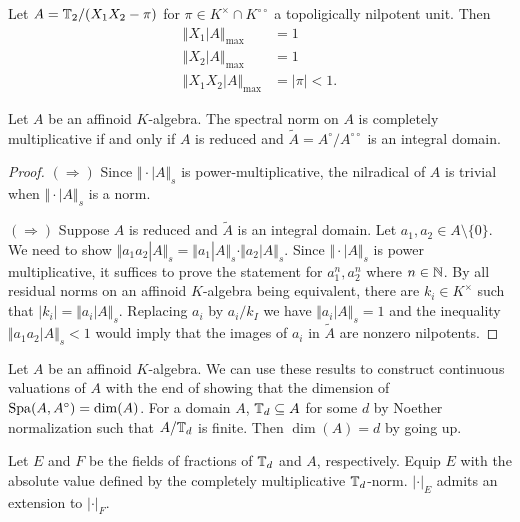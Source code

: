 \begin{example}
    Let $A=\mathbb{T}_{2}/(X_{1}X_{2}-\pi)$ for $\pi\in K^{\times}\cap K^{\circ\circ}$ a topoligically nilpotent unit. Then 
    \begin{align*}
        \Vert X_{1}|A\Vert_{\max}&=1 \\
        \Vert X_{2}|A\Vert_{\max}&=1 \\
        \Vert X_{1}X_{2}|A\Vert_{\max} &= |\pi|<1.
    \end{align*}
\end{example}
\begin{proposition}\label{prop: multiplicative iff reduced}
    Let $A$ be an affinoid $K$-algebra. The spectral norm on $A$ is completely multiplicative if and only if $A$ is reduced and $\widetilde{A}=A^{\circ}/A^{\circ\circ}$ is an integral domain. 
\end{proposition}
\begin{proof}
    $(\Rightarrow)$ Since $\Vert\cdot|A\Vert_{s}$ is power-multiplicative, the nilradical of $A$ is trivial when $\Vert\cdot|A\Vert_{s}$ is a norm. 

    $(\Rightarrow)$ Suppose $A$ is reduced and $\widetilde{A}$ is an integral domain. Let $a_{1},a_{2}\in A\setminus\{0\}$. We need to show $\Vert a_{1}a_{2}|A\Vert_{s}=\Vert a_{1}|A\Vert_{s}\cdot\Vert a_{2}|A\Vert_{s}$. Since $\Vert\cdot|A\Vert_{s}$ is power multiplicative, it suffices to prove the statement for $a_{1}^{n},a_{2}^{n}$ where $n\in\mathbb{N}$. By all residual norms on an affinoid $K$-algebra being equivalent, there are $k_{i}\in K^{\times}$ such that $|k_{i}|=\Vert a_{i}|A\Vert_{s}$. Replacing $a_{i}$ by $a_{i}/k_{I}$ we have $\Vert a_{i}|A\Vert_{s}=1$ and the inequality $\Vert a_{1}a_{2}|A\Vert_{s}<1$ would imply that the images of $a_{i}$ in $\widetilde{A}$ are nonzero nilpotents. 
\end{proof}
\begin{remark}
    Let $A$ be an affinoid $K$-algebra. We can use these results to construct continuous valuations of $A$ with the end of showing that the dimension of $\mathrm{Spa}(A,A^{\circ})=\dim(A)$. For a domain $A$, $\mathbb{T}_{d}\subseteq A$ for some $d$ by Noether normalization such that $A/\mathbb{T}_{d}$ is finite. Then $\dim(A)=d$ by going up. 
\end{remark} %
Let $E$ and $F$ be the fields of fractions of $\mathbb{T}_{d}$ and $A$, respectively. Equip $E$ with the absolute value defined by the completely multiplicative $\mathbb{T}_{d}$-norm. $|\cdot|_{E}$ admits an extension to $|\cdot|_{F}$. 
